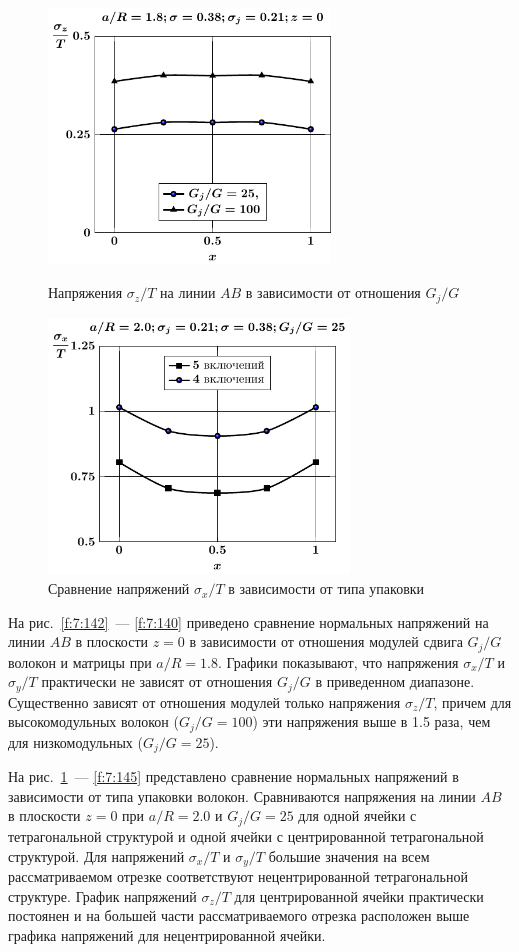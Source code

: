 \begin{figure}[h!]
\centering\footnotesize
\parbox[b]{7.5cm}{\centering\includegraphics[width=7.5cm]{inc5-g-a18-sig_z.pdf}
\caption{Напряжения $\sigma_z/T$ на линии $AB$ в зависимости от отношения $G_j/G$
\label{f:7:140}}}\hfil\hfil
\parbox[b]{7.5cm}{\centering\includegraphics[width=8cm]{inc5-4-a20-g25-z0-sig_x.pdf}
\caption{Сравнение напряжений $\sigma_x/T$ в зависимости от типа упаковки
\label{f:7:141}}}
\end{figure}

На рис.~\ref{f:7:142}~--- \ref{f:7:140} приведено сравнение нормальных напряжений на линии $AB$ в плоскости $z=0$ в зависимости от отношения модулей сдвига $G_j/G$ волокон и матрицы при $a/R=1.8$. Графики показывают, что напряжения $\sigma_x/T$ и $\sigma_y/T$ практически не зависят от отношения $G_j/G$ в приведенном диапазоне. Существенно зависят от отношения модулей только напряжения $\sigma_z/T$, причем для высокомодульных волокон ($G_j/G=100$) эти напряжения выше в 1.5 раза, чем для низкомодульных ($G_j/G=25$).

На рис.~\ref{f:7:141}~--- \ref{f:7:145} представлено сравнение нормальных напряжений в зависимости от типа упаковки волокон. Сравниваются напряжения на линии $AB$ в плоскости $z=0$ при $a/R=2.0$ и $G_j/G=25$ для одной ячейки с тетрагональной структурой и одной ячейки с центрированной тетрагональной структурой. Для напряжений $\sigma_x/T$ и $\sigma_y/T$ большие значения на всем рассматриваемом отрезке соответствуют нецентрированной тетрагональной структуре. График напряжений $\sigma_z/T$ для центрированной ячейки практически постоянен и на большей части рассматриваемого отрезка расположен выше графика напряжений для нецентрированной ячейки.

